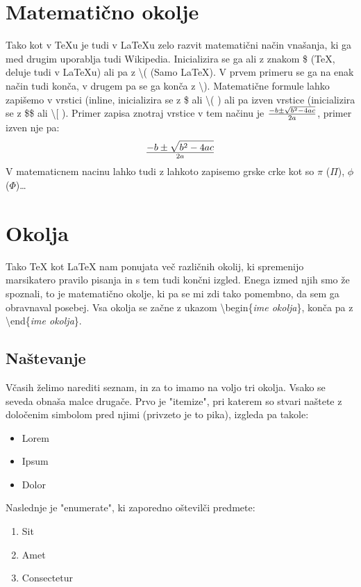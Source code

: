 \documentclass[a4paper]{book}
\newcommand\tbs{\textbackslash{}}
\begin{document}
\section{Matematično okolje}
Tako kot v \TeX{}u je tudi v \LaTeX{}u zelo razvit matematični način vnašanja, ki ga med drugim uporablja tudi Wikipedia. Inicializira se ga ali z znakom \${} (\TeX{}, deluje tudi v \LaTeX{}u) ali pa z \tbs{}( (Samo \LaTeX{}). V prvem primeru se ga na enak način tudi konča, v drugem pa se ga konča z \tbs{}). Matematične formule lahko zapišemo v vrstici (inline, inicializira se z \${} ali \tbs{}( ) ali pa izven vrstice (inicializira se z \${}\${} ali \tbs{}[ ). Primer zapisa znotraj vrstice v tem načinu je \(- b \pm \sqrt{b^2 - 4ac} \over 2a\), primer izven nje pa: \[- b \pm \sqrt{b^2 - 4ac} \over 2a\] V matematicnem nacinu lahko tudi z lahkoto zapisemo grske crke kot so $\pi{}$ ($\Pi{}$), $\phi{}$ ($\Phi{}$)\ldots


\section{Okolja}

Tako \TeX{} kot \LaTeX{} nam ponujata več različnih okolij, ki spremenijo marsikatero pravilo pisanja in s tem tudi končni izgled. Enega izmed njih smo že spoznali, to je matematično okolje, ki pa se mi zdi tako pomembno, da sem ga obravnaval posebej. Vsa okolja se začne z ukazom \tbs{}begin\{{\em ime okolja}\}, konča pa z \tbs{}end\{{\em ime okolja}\}.

\subsection{Naštevanje}
Včasih želimo narediti seznam, in za to imamo na voljo tri okolja. Vsako se seveda obnaša malce drugače. Prvo je "itemize", pri katerem so stvari naštete z določenim simbolom pred njimi (privzeto je to pika), izgleda pa takole:
\begin{itemize}
\item Lorem
\item Ipsum
\item Dolor
\end{itemize}

Naslednje je "enumerate", ki zaporedno oštevilči predmete:
\begin{enumerate}
\item Sit
\item Amet
\item Consectetur
\end{enumerate}
\end{document}
